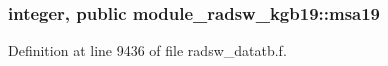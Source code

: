 \subsubsection[{\texorpdfstring{msa19}{msa19}}]{\setlength{\rightskip}{0pt plus 5cm}integer, public module\+\_\+radsw\+\_\+kgb19\+::msa19}\hypertarget{namespacemodule__radsw__kgb19_a498993cce64baa8f22c8dfdce632cf85}{}\label{namespacemodule__radsw__kgb19_a498993cce64baa8f22c8dfdce632cf85}


Definition at line 9436 of file radsw\+\_\+datatb.\+f.

